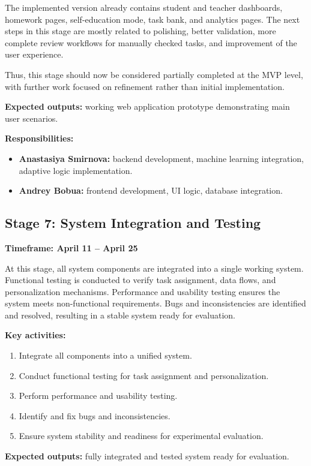 \documentclass[a4paper,12pt]{extarticle}
\begin{document}
The implemented version already contains student and teacher dashboards, homework pages, self-education mode, task bank, and analytics pages. The next steps in this stage are mostly related to polishing, better validation, more complete review workflows for manually checked tasks, and improvement of the user experience.

Thus, this stage should now be considered partially completed at the MVP level, with further work focused on refinement rather than initial implementation.

\textbf{Expected outputs:} working web application prototype demonstrating main user scenarios.

\textbf{Responsibilities:}
\begin{itemize}
    \item \textbf{Anastasiya Smirnova:} backend development, machine learning integration, adaptive logic implementation.
    \item \textbf{Andrey Bobua:} frontend development, UI logic, database integration.
\end{itemize}

\subsection{Stage 7: System Integration and Testing}
\textbf{Timeframe: April 11 -- April 25}

At this stage, all system components are integrated into a single working system. Functional testing is conducted to verify task assignment, data flows, and personalization mechanisms. Performance and usability testing ensures the system meets non-functional requirements. Bugs and inconsistencies are identified and resolved, resulting in a stable system ready for evaluation.

\textbf{Key activities:}
\begin{enumerate}
    \item Integrate all components into a unified system.
    \item Conduct functional testing for task assignment and personalization.
    \item Perform performance and usability testing.
    \item Identify and fix bugs and inconsistencies.
    \item Ensure system stability and readiness for experimental evaluation.
\end{enumerate}

\textbf{Expected outputs:} fully integrated and tested system ready for evaluation.
\end{document}

